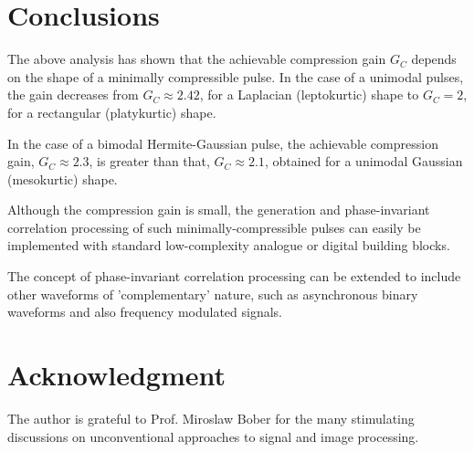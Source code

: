 \documentclass[journal]{IEEEtran}
\begin{document}
\section{Conclusions}
The above analysis has shown that the achievable compression gain $G_C$ depends on the shape of a minimally compressible pulse. In the case of a unimodal pulses, the gain decreases from 
$G_C \approx 2.42$, for a Laplacian (leptokurtic) shape to $G_C=2$, for a rectangular (platykurtic) shape.

In the case of a bimodal Hermite-Gaussian pulse, the achievable compression gain, 
$G_C \approx 2.3$, is greater than that, $G_C \approx 2.1$, obtained for a unimodal Gaussian 
(mesokurtic) shape.

Although the compression gain is small, the generation and phase-invariant correlation processing of such minimally-compressible pulses can easily be implemented with standard low-complexity analogue or digital building blocks.

The concept of phase-invariant correlation processing can be extended to include other waveforms of 'complementary' nature, such as asynchronous binary waveforms  and also frequency modulated signals.

\section*{Acknowledgment}
The author is grateful to Prof. Miroslaw Bober for the many stimulating discussions on unconventional approaches to signal and image processing.
\end{document}
